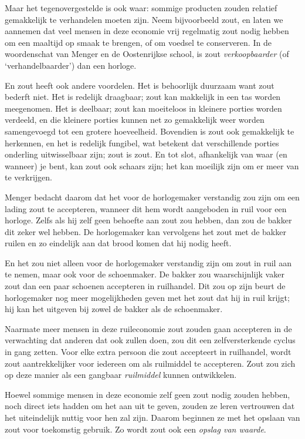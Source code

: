 \documentclass[smalldemyvopaper,11pt,twoside,onecolumn,openright,extrafontsizes,hidelinks]{memoir}
\begin{document}
Maar het tegenovergestelde is ook waar: sommige producten zouden
relatief gemakkelijk te verhandelen moeten zijn. Neem bijvoorbeeld zout,
en laten we aannemen dat veel mensen in deze economie vrij regelmatig
zout nodig hebben om een maaltijd op smaak te brengen, of om voedsel te
conserveren. In de woordenschat van Menger en de Oostenrijkse school, is
zout \emph{verkoopbaarder} (of `verhandelbaarder') dan een horloge.

En zout heeft ook andere voordelen. Het is behoorlijk duurzaam want zout
bederft niet. Het is redelijk draagbaar; zout kan makkelijk in een tas
worden meegenomen. Het is deelbaar; zout kan moeiteloos in kleinere
porties worden verdeeld, en die kleinere porties kunnen net zo
gemakkelijk weer worden samengevoegd tot een grotere hoeveelheid.
Bovendien is zout ook gemakkelijk te herkennen, en het is redelijk
fungibel, wat betekent dat verschillende porties onderling uitwisselbaar
zijn; zout is zout. En tot slot, afhankelijk van waar (en wanneer) je
bent, kan zout ook schaars zijn; het kan moeilijk zijn om er meer van te
verkrijgen.

Menger bedacht daarom dat het voor de horlogemaker verstandig zou zijn
om een lading zout te accepteren, wanneer dit hem wordt aangeboden in
ruil voor een horloge. Zelfs als hij zelf geen behoefte aan zout zou
hebben, dan zou de bakker dit zeker wel hebben. De horlogemaker kan
vervolgens het zout met de bakker ruilen en zo eindelijk aan dat brood
komen dat hij nodig heeft.

En het zou niet alleen voor de horlogemaker verstandig zijn om zout in
ruil aan te nemen, maar ook voor de schoenmaker. De bakker zou
waarschijnlijk vaker zout dan een paar schoenen accepteren in
ruilhandel. Dit zou op zijn beurt de horlogemaker nog meer mogelijkheden
geven met het zout dat hij in ruil krijgt; hij kan het uitgeven bij
zowel de bakker als de schoenmaker.

Naarmate meer mensen in deze ruileconomie zout zouden gaan accepteren in
de verwachting dat anderen dat ook zullen doen, zou dit een
zelfversterkende cyclus in gang zetten. Voor elke extra persoon die zout
accepteert in ruilhandel, wordt zout aantrekkelijker voor iedereen om
als ruilmiddel te accepteren. Zout zou zich op deze manier als een
gangbaar \emph{ruilmiddel} kunnen ontwikkelen.

Hoewel sommige mensen in deze economie zelf geen zout nodig zouden
hebben, noch direct iets hadden om het aan uit te geven, zouden ze leren
vertrouwen dat het uiteindelijk nuttig voor hen zal zijn. Daarom
beginnen ze met het opslaan van zout voor toekomstig gebruik. Zo wordt
zout ook een \emph{opslag van waarde}.
\end{document}
